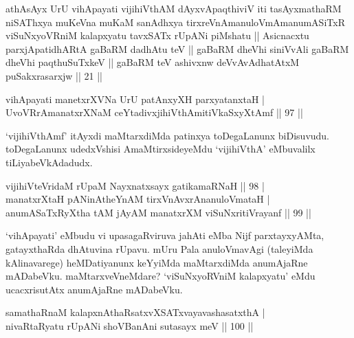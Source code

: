 
\begin{shl}
athAsAyx UrU vihApayati vijihiVthAM dAyxvApaqthiviV iti tasAyxmathaRM niSAThxya muKeVna muKaM sanAdhxya tirxreVnAmanuloVmAmanumASiTxR viSuNxyoVRniM kalapxyatu tavxSATx rUpANi piMshatu || Asicnacxtu parxjApatidhARtA gaBaRM dadhAtu teV || gaBaRM dheVhi siniVvAli gaBaRM dheVhi paqthuSuTxkeV || gaBaRM teV ashivxnw deVvAvAdhatAtxM puSakxrasarxjw || 21 ||
\end{shl}


\begin{shl}
vihApayati manetxrXVNa UrU patAnxyXH parxyatanxtaH | \\
UvoVRrAmanatxrXNaM ceYtadivxjihiVthAmitiVkaSxyXtAmf \hfill|| 97 || 
\end{shl}

\begin{artha}
`vijihiVthAmf' itAyxdi maMtarxdiMda patinxya toDegaLanunx biDisuvudu. 
\-toDegaLanunx udedxVshisi AmaMtirxsideyeMdu `vijihiVthA' eMbuvalilx 
tiLiya\-beVkAdadudx.
\end{artha}


\begin{shl}
vijihiVteVridaM rUpaM Nayxnatxsayx gatikamaRNaH \hfill|| 98 | \\
manatxrXtaH pANinA\s theYnAM tirxVnAvxrAnanuloVmataH | \\
anumASaTxRyXtha tAM jAyAM manatxrXM viSuNxritiVrayanf \hfill|| 99 || 
\end{shl}

\begin{artha}
`vihApayati' eMbudu vi upasagaRviruva ja{hA}ti eMba Nijf parxtayxyAMta, 
gatayxthaRda dhAtuvina rUpavu. mUru Pala anuloVmavAgi (taleyiMda 
kAlinavarege) heMDatiyanunx keYyiMda maMtarxdiMda anumAjaRne 
mADabeVku. maMtarxveVneMdare? `viSuNxyoRVniM kalapxyatu' eMdu 
ucacxrisutAtx anumAjaRne mADabeVku.
\end{artha}


\begin{shl}
samathaRnaM kalapxnAthaRsatxvXSATx\s vayavashasatxthA | \\
nivaRtaRyatu rUpANi shoVBanAni sutasayx meV \hfill|| 100 || 
\end{shl}

